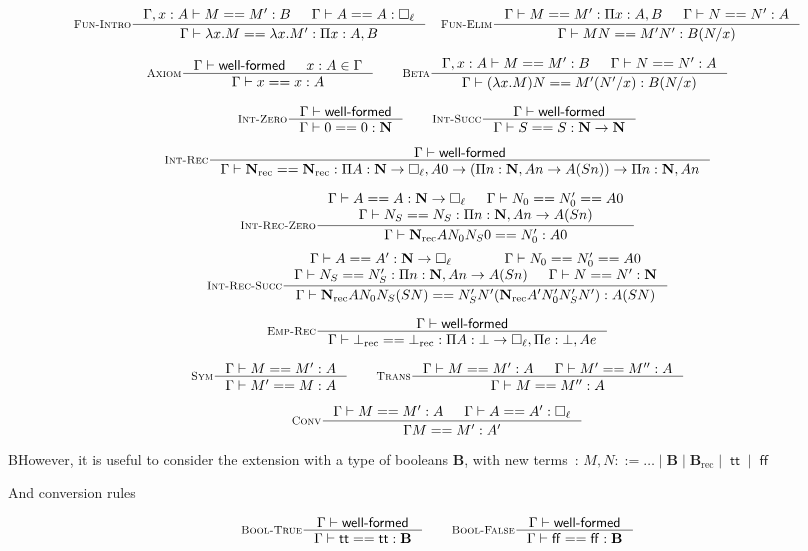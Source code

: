 \documentclass[11pt]{article}
\DeclareMathOperator{\rec}{rec}
\DeclareMathOperator{\true}{\mathsf{tt}}
\DeclareMathOperator{\false}{\mathsf{ff}}
\newcommand{\0}{\mathbf{0}}
\newcommand{\1}{\mathbf{1}}
\newcommand{\nat}{\mathbf{N}}
\newcommand{\bool}{\mathbf{B}}
\newcommand{\tctx}{\Gamma}
\newcommand{\Wf}{\textsf{well-formed}}
\begin{document}
$$
    \inference[\textsc{Fun-Intro}]{\tctx, x : A |- M == M' : B &\tctx |- A == A : \square_\ell}{\tctx |- \lambda x. M == \lambda x. M' : \Pi x : A, B} \quad
    \inference[\textsc{Fun-Elim}]{\tctx |- M == M' : \Pi x:A, B& \tctx |- N == N' : A}{\tctx |- MN == M'N' : B(N/x)}
$$

$$
    \inference[\textsc{Axiom}]{\tctx |- \Wf & x : A \in \tctx }{\tctx |- x == x : A} \qquad
    \inference[\textsc{Beta}]{\tctx, x : A |- M == M' : B & \tctx |- N == N' : A}{\tctx |- (\lambda x. M)N == M'(N'/x) : B(N/x)}
$$

$$
    \inference[\textsc{Int-Zero}]{\tctx |- \Wf}{\tctx |- 0 == 0 : \nat} \qquad
    \inference[\textsc{Int-Succ}]{\tctx |- \Wf}{\tctx |- S == S : \nat -> \nat}
$$

$$
    \inference[\textsc{Int-Rec}]{\tctx |- \Wf}{\tctx |- \nat_{\rec} == \nat_{\rec} : \Pi A : \nat \to \square_\ell, A 0 \to \left(\Pi n:\nat, A n \to A (S n)\right) \to \Pi n :\nat, A n}
$$


$$
    \inference[\textsc{Int-Rec-Zero}]{\tctx |- A == A : \nat -> \square_\ell & \tctx |- N_0 == N'_0 == A 0\\ \tctx |- N_S == N_S : \Pi n:\nat, A n -> A(S n)}{\tctx |- \nat_{\rec} A N_0N_S0 == N'_0 : A 0}
$$
$$
    \inference[\textsc{Int-Rec-Succ}]{\tctx |- A == A' : \nat -> \square_\ell & \tctx |- N_0 == N'_0 == A 0\\ \tctx |- N_S == N'_S : \Pi n:\nat, A n -> A(S n) & \tctx |- N == N' :\nat}{\tctx |- \nat_{\rec} A N_0N_S (S N) == N'_S N' (\nat_{\rec}A' N'_0 N'_S N') : A (S N)}
$$


$$
    \inference[\textsc{Emp-Rec}]{\tctx |- \Wf}{\tctx |- \bot_{\rec} == \bot_{\rec} : \Pi A : \bot \to \square_\ell,\Pi e :\bot, A e}
$$

$$
    \inference[\textsc{Sym}]{\tctx |- M == M' : A}{\tctx |- M' == M : A} \qquad
    \inference[\textsc{Trans}]
    {\tctx |- M == M' :A & \tctx |- M' == M'' : A}{\tctx |- M == M'' : A}
$$

$$
    \inference[\textsc{Conv}]
    {\tctx |- M == M' :A & \tctx |- A == A' : \square_\ell}{\tctx M ==M' : A'}
$$

BHowever, it is useful to consider the extension with a type of booleans $\bool$, with new terms~:
 $ M,N ::= \dots \mid \bool\mid \bool_{\rec}\mid \true\mid \false$

 And conversion rules

$$
    \inference[\textsc{Bool-True}]{\tctx |- \Wf}{\tctx |- \true == \true : \bool} \qquad
    \inference[\textsc{Bool-False}]{\tctx |- \Wf}{\tctx |- \false == \false : \bool}
$$
\end{document}
